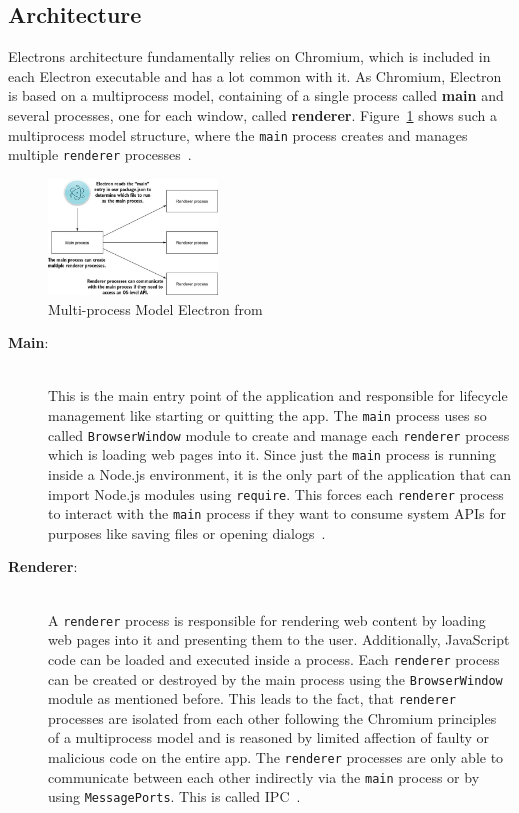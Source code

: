 \subsection{Architecture}
\label{subsec:electron:architecture}
Electrons architecture fundamentally relies on Chromium, which is included in each Electron executable and has a lot common with it.
As Chromium, Electron is based on a multiprocess model, containing of a single process called \textbf{main} and several processes, one for each window, called \textbf{renderer}.
Figure~\ref{fig:electron:model} shows such a multiprocess model structure, where the \texttt{main} process creates and manages multiple \texttt{renderer} processes~\cite[Chapter 1.5]{electron-in-action}.
\begin{figure}[ht]
    \centering
    \includegraphics[width=0.4\textwidth]{images/electron-model}
    \caption[Bla]{Multi-process Model Electron from~\cite[Fig. 1.7]{electron-in-action}}
    \label{fig:electron:model}
\end{figure}
\begin{description}
    \item[\textbf{Main}:] \hfill \\ This is the main entry point of the application and responsible for lifecycle management like starting or quitting the app.
    The \texttt{main} process uses so called \texttt{BrowserWindow} module to create and manage each \texttt{renderer} process which is loading web pages into it.
    Since just the \texttt{main} process is running inside a Node.js environment, it is the only part of the application that can import Node.js modules using \texttt{require}.
    This forces each \texttt{renderer} process to interact with the \texttt{main} process if they want to consume system \ac{API}s for purposes like saving files or opening dialogs~\cite{ElectronDoc,electron-in-action}.

    \item[\textbf{Renderer}:] \hfill \\ A \texttt{renderer} process is responsible for rendering web content by loading web pages into it and presenting them to the user.
    Additionally, JavaScript code can be loaded and executed inside a process.
    Each \texttt{renderer} process can be created or destroyed by the main process using the \texttt{BrowserWindow} module as mentioned before.
    This leads to the fact, that \texttt{renderer} processes are isolated from each other following the Chromium principles of a multiprocess model and is reasoned by limited affection of
    faulty or malicious code on the entire app.
    The \texttt{renderer} processes are only able to communicate between each other indirectly via the \texttt{main} process or by using \texttt{MessagePorts}.
    This is called \ac{IPC}~\cite{ElectronDoc,electron-in-action}.
\end{description}

